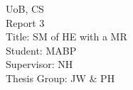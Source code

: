 \begin{titlepage}
\begin{center}

	{UoB, CS}\\
	{Report 3}\\
	{Title: SM of HE with a MR}\\
	{Student: MABP}\\
	{Supervisor: NH}\\
	{Thesis Group: JW & PH}

\end{center}
\end{titlepage}
